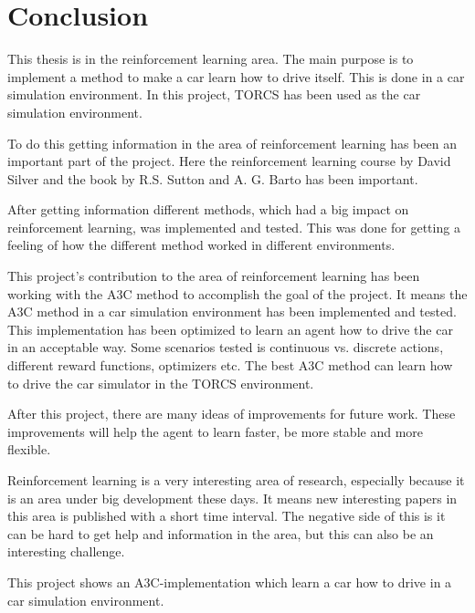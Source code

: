 \chapter{Conclusion}\label{Conclusion}
This thesis is in the reinforcement learning area. The main purpose is to implement a method to make a car learn how to drive itself. This is done in a car simulation environment. In this project, TORCS has been used as the car simulation environment.  

To do this getting information in the area of reinforcement learning has been an important part of the project. Here the reinforcement learning course by David Silver \cite{RL_course} and the book by R.S. Sutton and A. G. Barto \cite{Sutton} has been important. 

After getting information different methods, which had a big impact on reinforcement learning, was implemented and tested. This was done for getting a feeling of how the different method worked in different environments.  

This project's contribution to the area of reinforcement learning has been working with the A3C method to accomplish the goal of the project. It means the A3C method in a car simulation environment has been implemented and tested. This implementation has been optimized to learn an agent how to drive the car in an acceptable way. Some scenarios tested is continuous vs. discrete actions, different reward functions, optimizers etc. The best A3C method can learn how to drive the car simulator in the TORCS environment.    

After this project, there are many ideas of improvements for future work. These improvements will help the agent to learn faster, be more stable and more flexible. 

Reinforcement learning is a very interesting area of research, especially because it is an area under big development these days. It means new interesting papers in this area is published with a short time interval. The negative side of this is it can be hard to get help and information in the area, but this can also be an interesting challenge.

This project shows an A3C-implementation which learn a car how to drive in a car simulation environment.     
